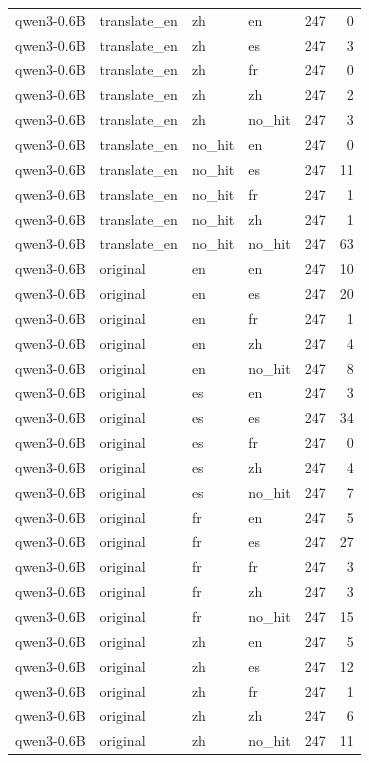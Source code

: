 \begin{tabular}{llllrr}
qwen3-0.6B & translate\_en & zh & en & 247 & 0 \\
qwen3-0.6B & translate\_en & zh & es & 247 & 3 \\
qwen3-0.6B & translate\_en & zh & fr & 247 & 0 \\
qwen3-0.6B & translate\_en & zh & zh & 247 & 2 \\
qwen3-0.6B & translate\_en & zh & no\_hit & 247 & 3 \\
qwen3-0.6B & translate\_en & no\_hit & en & 247 & 0 \\
qwen3-0.6B & translate\_en & no\_hit & es & 247 & 11 \\
qwen3-0.6B & translate\_en & no\_hit & fr & 247 & 1 \\
qwen3-0.6B & translate\_en & no\_hit & zh & 247 & 1 \\
qwen3-0.6B & translate\_en & no\_hit & no\_hit & 247 & 63 \\
qwen3-0.6B & original & en & en & 247 & 10 \\
qwen3-0.6B & original & en & es & 247 & 20 \\
qwen3-0.6B & original & en & fr & 247 & 1 \\
qwen3-0.6B & original & en & zh & 247 & 4 \\
qwen3-0.6B & original & en & no\_hit & 247 & 8 \\
qwen3-0.6B & original & es & en & 247 & 3 \\
qwen3-0.6B & original & es & es & 247 & 34 \\
qwen3-0.6B & original & es & fr & 247 & 0 \\
qwen3-0.6B & original & es & zh & 247 & 4 \\
qwen3-0.6B & original & es & no\_hit & 247 & 7 \\
qwen3-0.6B & original & fr & en & 247 & 5 \\
qwen3-0.6B & original & fr & es & 247 & 27 \\
qwen3-0.6B & original & fr & fr & 247 & 3 \\
qwen3-0.6B & original & fr & zh & 247 & 3 \\
qwen3-0.6B & original & fr & no\_hit & 247 & 15 \\
qwen3-0.6B & original & zh & en & 247 & 5 \\
qwen3-0.6B & original & zh & es & 247 & 12 \\
qwen3-0.6B & original & zh & fr & 247 & 1 \\
qwen3-0.6B & original & zh & zh & 247 & 6 \\
qwen3-0.6B & original & zh & no\_hit & 247 & 11 \\

\end{tabular}
